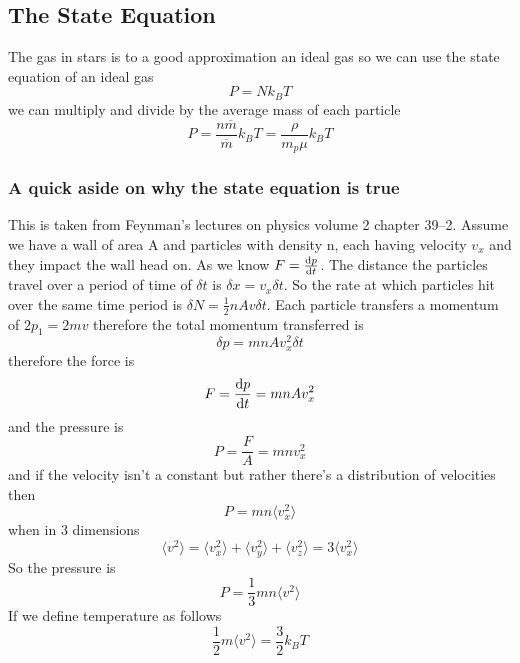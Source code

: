 \subsection{The State Equation}
The gas in stars is to a good approximation an ideal gas so we can use the state equation of an ideal gas
\begin{equation}
	P = Nk_B T
\end{equation}
we can multiply and divide by the average mass of each particle 
\begin{equation}
	P = \frac{n\overline{m}}{\overline{m}}k_B T = \frac{\rho}{m_p\mu}k_B T
\end{equation}
\subsubsection{A quick aside on why the state equation is true}
This is taken from Feynman's lectures on physics volume 2 chapter 39--2. Assume we have a wall of area A and particles with density n, each having velocity \(v_x\) and they impact the wall head on. As we know \(F=\diff{p}{t}\). The distance the particles travel over a period of time of \(\delta t\) is \(\delta x = v_x\delta t\). So the rate at which particles hit over the same time period is \(\delta N = \frac{1}{2}nAv\delta t\). Each particle transfers a momentum of \(2p_1=2mv\) therefore the total momentum transferred is
\begin{equation}
	\delta p = mnAv_x^2\delta t
\end{equation}
therefore the force is 
\begin{equation}
	F = \diff{p}{t} = mnAv_x^2
\end{equation}
and the pressure is
\begin{equation}
	P=\frac{F}{A}=mnv_x^2
\end{equation}
and if the velocity isn't a constant but rather there's a distribution of velocities then
\begin{equation}
	P=mn\langle v_x^2\rangle
\end{equation}
when in 3 dimensions
\begin{equation}
	\langle v^2 \rangle = \langle v_x^2 \rangle + \langle v_y^2 \rangle + \langle v_z^2 \rangle = 3\langle v_x^2 \rangle
\end{equation}
So the pressure is
\begin{equation}
	P=\frac{1}{3}mn\langle v^2 \rangle
\end{equation}
If we define temperature as follows
\begin{equation}
	\frac{1}{2}m\langle v^2 \rangle = \frac{3}{2}k_B T
\end{equation}
